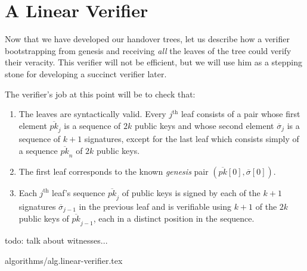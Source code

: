 \section{A Linear Verifier}\label{sec.verifier}

Now that we have developed our handover trees, let us describe how
a verifier bootstrapping from genesis and receiving \emph{all} the leaves of the tree
could verify their veracity. This verifier will not be efficient, but
we will use him as a stepping stone for developing a succinct verifier
later.

The verifier's job at this point will be to check that:

\begin{enumerate}
  \item The leaves are syntactically valid. Every $j^\text{th}$ leaf
        consists of a
        pair whose first element $\overline{pk}_j$
        is a sequence of $2k$ public keys and whose second element
        $\overline\sigma_j$ is a
        sequence of $k+1$ signatures, except for the last leaf which consists
        simply of a sequence $\overline{pk}_n$ of $2k$ public keys.
  \item The first leaf corresponds to the known \emph{genesis} pair
        $(\overline{pk}[0], \overline{\sigma}[0])$.
  \item Each $j^\text{th}$ leaf's sequence $\overline{pk}_j$ of public
        keys is signed by each of the $k+1$ signatures
        $\overline\sigma_{j-1}$ in the previous leaf
        and is verifiable using $k+1$ of the $2k$ public keys
        of $\overline{pk}_{j-1}$, each in a distinct position
        in the sequence.
\end{enumerate}

todo: talk about witnesses...

{algorithms/alg.linear-verifier.tex}
